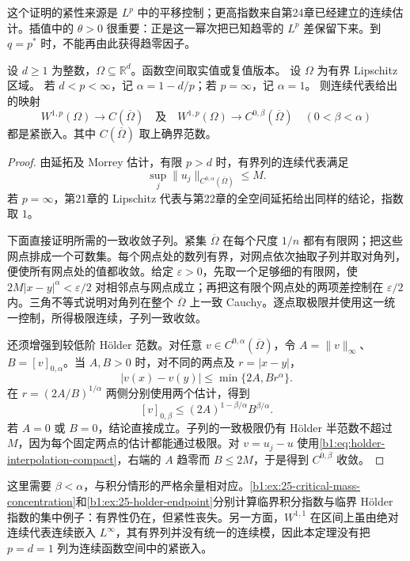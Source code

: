 这个证明的紧性来源是 \(L^p\) 中的平移控制；更高指数来自第24章已经建立的连续估计。插值中的 \(\theta>0\) 很重要：正是这一幂次把已知趋零的 \(L^p\) 差保留下来。到 \(q=p^*\) 时，不能再由此获得趋零因子。

\begin{theorem}\label{b1:thm:rellich-holder}
设 \(d\geq1\) 为整数，\(\Omega\subseteq\mathbb R^d\)。函数空间取实值或复值版本。
设 \(\Omega\) 为有界 Lipschitz 区域。
若 \(d<p<\infty\)，记 \(\alpha=1-d/p\)；若 \(p=\infty\)，记 \(\alpha=1\)。
则连续代表给出的映射
\[
 W^{1,p}(\Omega)\longrightarrow C(\overline\Omega)
 \quad\text{及}\quad
 W^{1,p}(\Omega)\longrightarrow C^{0,\beta}(\overline\Omega)
 \quad(0<\beta<\alpha)
\]
都是紧嵌入。其中 \(C(\overline\Omega)\) 取上确界范数。
\end{theorem}
\begin{proof}
由延拓及 Morrey 估计，有限 \(p>d\) 时，有界列的连续代表满足
\[
 \sup_j\|u_j\|_{C^{0,\alpha}(\overline\Omega)}\le M.
\]
若 \(p=\infty\)，第21章的 Lipschitz 代表与第22章的全空间延拓给出同样的结论，指数取 \(1\)。

下面直接证明所需的一致收敛子列。紧集 \(\overline\Omega\) 在每个尺度 \(1/n\) 都有有限网；把这些网点排成一个可数集。每个网点处的数列有界，对网点依次抽取子列并取对角列，便使所有网点处的值都收敛。给定 \(\varepsilon>0\)，先取一个足够细的有限网，使 \(2M|x-y|^\alpha<\varepsilon/2\) 对相邻点与网点成立；再把这有限个网点处的两项差控制在 \(\varepsilon/2\) 内。三角不等式说明对角列在整个 \(\overline\Omega\) 上一致 Cauchy。逐点取极限并使用这一统一控制，所得极限连续，子列一致收敛。

还须增强到较低阶 Hölder 范数。对任意 \(v\in C^{0,\alpha}(\overline\Omega)\)，令 \(A=\|v\|_\infty\)、\(B=[v]_{0,\alpha}\)。当 \(A,B>0\) 时，对不同的两点及 \(r=|x-y|\)，
\[
 |v(x)-v(y)|\le\min\{2A,Br^\alpha\}.
\]
在 \(r=(2A/B)^{1/\alpha}\) 两侧分别使用两个估计，得到
\begin{equation}\label{b1:eq:holder-interpolation-compact}
 [v]_{0,\beta}\le
 (2A)^{1-\beta/\alpha}B^{\beta/\alpha}.
\end{equation}
若 \(A=0\) 或 \(B=0\)，结论直接成立。子列的一致极限仍有 Hölder 半范数不超过 \(M\)，因为每个固定两点的估计都能通过极限。对 \(v=u_j-u\) 使用\eqref{b1:eq:holder-interpolation-compact}，右端的 \(A\) 趋零而 \(B\le2M\)，于是得到 \(C^{0,\beta}\) 收敛。
\end{proof}

这里需要 \(\beta<\alpha\)，与积分情形的严格余量相对应。\cref{b1:ex:25-critical-mass-concentration}和\cref{b1:ex:25-holder-endpoint}分别计算临界积分指数与临界 Hölder 指数的集中例子：有界性仍在，但紧性丧失。另一方面，\(W^{1,1}\) 在区间上虽由绝对连续代表连续嵌入 \(L^\infty\)，其有界列并没有统一的连续模，因此本定理没有把 \(p=d=1\) 列为连续函数空间中的紧嵌入。

